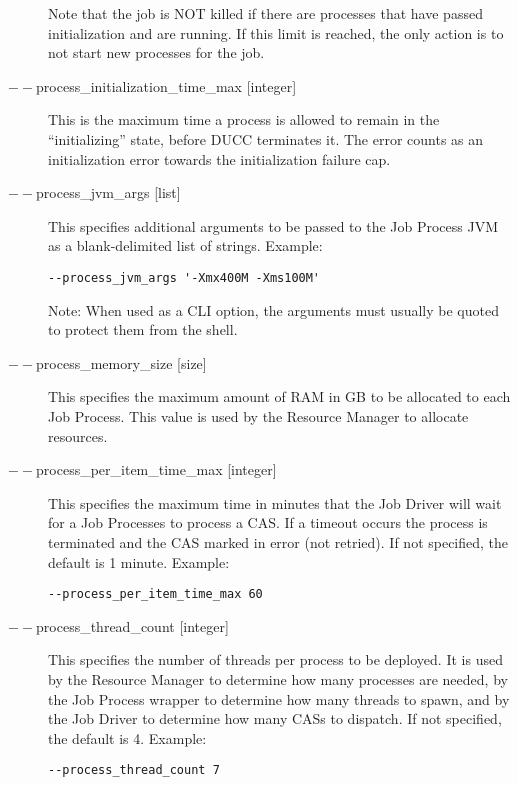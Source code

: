 \begin{description}
             Note that the job is NOT killed if there are processes that have passed initialization and are 
             running. If this limit is reached, the only action is to not start new processes for the job. 

           \item[$--$process\_initialization\_time\_max {[integer]}] This is the maximum time a process
             is allowed to remain in the ``initializing'' state, before DUCC terminates it.  The error
             counts as an initialization error towards the initialization failure cap.

           \item[$--$process\_jvm\_args {[list]} ] This specifies additional arguments to be passed to
             the Job Process JVM as a blank-delimited list of strings. Example:
             \begin{verbatim}
--process_jvm_args '-Xmx400M -Xms100M' 
             \end{verbatim}

             Note: When used as a CLI option, the arguments must usually be
             quoted to protect them from the shell.
                          
           \item[$--$process\_memory\_size {[size]} ] This specifies the maximum amount of RAM in GB
             to be allocated to each Job Process.  This value is used by the Resource Manager to
             allocate resources.

           \item[$--$process\_per\_item\_time\_max {[integer]} ] This specifies the maximum time in
             minutes that the Job Driver will wait for a Job Processes to process a CAS. If a
             timeout occurs the process is terminated and the CAS marked in error (not retried). If
             not specified, the default is 1 minute. Example:
             \begin{verbatim}
--process_per_item_time_max 60 
             \end{verbatim}
             
           \item[$--$process\_thread\_count {[integer]} ] This specifies the number of threads per
             process to be deployed. It is used by the Resource Manager to determine how many
             processes are needed, by the Job Process wrapper to determine how many threads to
             spawn, and by the Job Driver to determine how many CASs to dispatch. If not specified,
             the default is 4. Example:
             \begin{verbatim}
--process_thread_count 7 
             \end{verbatim}
             

\end{description}
